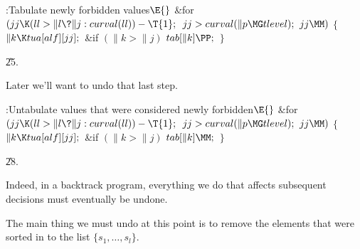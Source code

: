 \Y\B\4:Tabulate newly forbidden values\X${}\E{}$\6
\&{for} ${}(\\{jj}\K(\\{ll}>\|l\?\|j:\\{curval}(\\{ll}))-\T{1};{}$ ${}\\{jj}>%
\\{curval}(\|p\MG\\{tlevel});{}$ ${}\\{jj}\MM){}$\5
${}\{{}$\1\6
${}\|k\K\\{tua}[\\{alf}][\\{jj}];{}$\6
\&{if} ${}(\|k>\|j){}$\1\5
${}\\{tab}[\|k]\PP;{}$\2\6
\4${}\}{}$\2\par
\U25.\fi

Later we'll want to undo that last step.

\Y\B\4:Untabulate values that were considered newly forbidden\X${}\E{}$\6
\&{for} ${}(\\{jj}\K(\\{ll}>\|l\?\|j:\\{curval}(\\{ll}))-\T{1};{}$ ${}\\{jj}>%
\\{curval}(\|p\MG\\{tlevel});{}$ ${}\\{jj}\MM){}$\5
${}\{{}$\1\6
${}\|k\K\\{tua}[\\{alf}][\\{jj}];{}$\6
\&{if} ${}(\|k>\|j){}$\1\5
${}\\{tab}[\|k]\MM;{}$\2\6
\4${}\}{}$\2\par
\U28.\fi

Indeed, in a backtrack program, everything we do that
affects subsequent
decisions must eventually be undone.

The main thing we must undo at this point is to remove the 
elements that were sorted in to the list $\{s_1,\ldots,s_l\}$.

